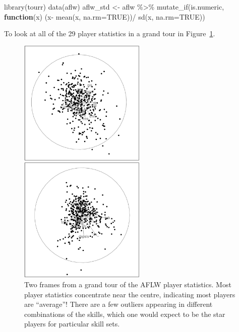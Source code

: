 \documentclass[
  letterpaper,
]{krantz}
\newenvironment{Shaded}{\begin{snugshade}}{\end{snugshade}}
\newcommand{\AttributeTok}[1]{\textcolor[rgb]{0.40,0.45,0.13}{#1}}
\newcommand{\ConstantTok}[1]{\textcolor[rgb]{0.56,0.35,0.01}{#1}}
\newcommand{\ControlFlowTok}[1]{\textcolor[rgb]{0.00,0.23,0.31}{\textbf{#1}}}
\newcommand{\FunctionTok}[1]{\textcolor[rgb]{0.28,0.35,0.67}{#1}}
\newcommand{\NormalTok}[1]{\textcolor[rgb]{0.00,0.23,0.31}{#1}}
\newcommand{\OtherTok}[1]{\textcolor[rgb]{0.00,0.23,0.31}{#1}}
\newcommand{\SpecialCharTok}[1]{\textcolor[rgb]{0.37,0.37,0.37}{#1}}
\begin{document}
\begin{Shaded}
\begin{Highlighting}[]
\FunctionTok{library}\NormalTok{(tourr)}
\FunctionTok{data}\NormalTok{(aflw)}
\NormalTok{aflw\_std }\OtherTok{\textless{}{-}}\NormalTok{ aflw }\SpecialCharTok{\%\textgreater{}\%}
  \FunctionTok{mutate\_if}\NormalTok{(is.numeric, }\ControlFlowTok{function}\NormalTok{(x) (x}\SpecialCharTok{{-}}
      \FunctionTok{mean}\NormalTok{(x, }\AttributeTok{na.rm=}\ConstantTok{TRUE}\NormalTok{))}\SpecialCharTok{/}
      \FunctionTok{sd}\NormalTok{(x, }\AttributeTok{na.rm=}\ConstantTok{TRUE}\NormalTok{))}
\end{Highlighting}
\end{Shaded}

To look at all of the 29 player statistics in a grand tour in
Figure~\ref{fig-aflw-gt-pdf}.

\begin{figure}

\begin{minipage}{0.50\linewidth}
\includegraphics[width=2.375in,height=\textheight,keepaspectratio]{images/aflw_gt_70.png}\end{minipage}%
%
\begin{minipage}{0.50\linewidth}
\includegraphics[width=2.375in,height=\textheight,keepaspectratio]{images/aflw_gt_329.png}\end{minipage}%

\caption{\label{fig-aflw-gt-pdf}Two frames from a grand tour of the AFLW
player statistics. Most player statistics concentrate near the centre,
indicating most players are ``average''! There are a few outliers
appearing in different combinations of the skills, which one would
expect to be the star players for particular skill sets.
}

\end{figure}%
\end{document}
